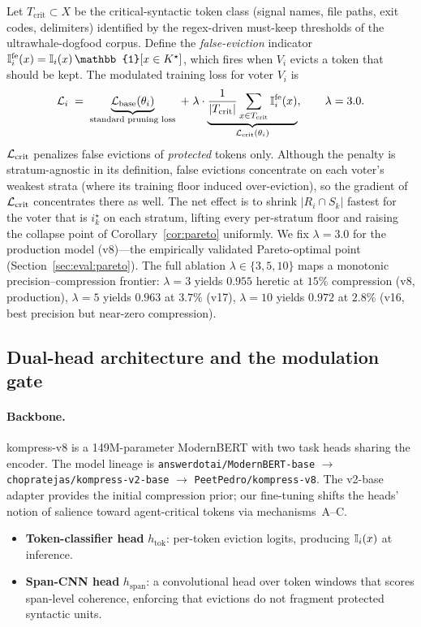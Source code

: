 Let $T_{\mathrm{crit}} \subset X$ be the critical-syntactic token class
(signal names, file paths, exit codes, delimiters) identified by the
regex-driven must-keep thresholds of the ultrawhale-dogfood corpus. Define the
\emph{false-eviction} indicator
$\I^{\mathrm{fe}}_i(x) = \I_i(x)\,\mathbb{1}[x \in K^{\star}]$, which fires
when $V_i$ evicts a token that should be kept. The modulated training loss for
voter $V_i$ is
\[
  \mathcal{L}_i
  \;=\;
  \underbrace{\mathcal{L}_{\mathrm{base}}(\theta_i)}_{\text{standard pruning loss}}
  \;+\;
  \lambda\cdot
  \underbrace{\frac{1}{|T_{\mathrm{crit}}|}
              \sum_{x \in T_{\mathrm{crit}}} \mathbb{I}^{\mathrm{fe}}_i(x)}_{\mathcal{L}_{\mathrm{crit}}(\theta_i)},
  \qquad \lambda = 3.0.
\]
$\mathcal{L}_{\mathrm{crit}}$ penalizes false evictions of \emph{protected} tokens only. Although
the penalty is stratum-agnostic in its definition, false evictions concentrate
on each voter's weakest strata (where its training floor induced
over-eviction), so the gradient of $\mathcal{L}_{\mathrm{crit}}$ concentrates there as well. The
net effect is to shrink $|R_i \cap S_k|$ fastest for the voter that is
$i^{\star}_k$ on each stratum, lifting every per-stratum floor and raising the
collapse point of Corollary~\ref{cor:pareto} uniformly. We fix $\lambda=3.0$
for the production model (v8)---the empirically validated Pareto-optimal
point (Section~\ref{sec:eval:pareto}). The full ablation
$\lambda\in\{3,5,10\}$ maps a monotonic precision--compression frontier:
$\lambda{=}3$ yields $0.955$ heretic at $15\%$ compression (v8, production),
$\lambda{=}5$ yields $0.963$ at $3.7\%$ (v17), $\lambda{=}10$ yields $0.972$
at $2.8\%$ (v16, best precision but near-zero compression).

\subsection{Dual-head architecture and the modulation gate}
\label{sec:arch}

\paragraph{Backbone.} kompress-v8 is a 149M-parameter ModernBERT
\citep{warner2024modernbert} with two task heads sharing the encoder. The
model lineage is \texttt{answerdotai/ModernBERT-base}
$\to$ \texttt{chopratejas/kompress-v2-base} $\to$
\texttt{PeetPedro/kompress-v8}. The v2-base adapter provides the initial
compression prior; our fine-tuning shifts the heads' notion of salience
toward agent-critical tokens via mechanisms~A--C.

\begin{itemize}
  \item \textbf{Token-classifier head} $h_{\mathrm{tok}}$: per-token eviction
        logits, producing $\mathbb{I}_i(x)$ at inference.
  \item \textbf{Span-CNN head} $h_{\mathrm{span}}$: a convolutional head over
        token windows that scores span-level coherence, enforcing that
        evictions do not fragment protected syntactic units.
\end{itemize}

